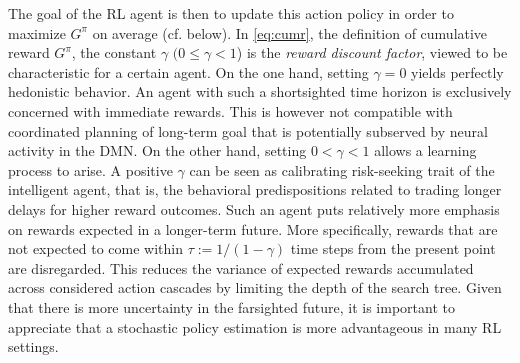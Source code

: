 \documentclass[10pt,letterpaper]{article}
\begin{document}
The goal of the RL agent is then to update this action policy in order
to maximize $G^\pi$ on average (cf. below). In \eqref{eq:cumr},
the definition of cumulative reward $G^\pi$,
the constant $\gamma$ $(0 \le \gamma < 1$) is the \textit{reward discount factor},
viewed to be characteristic for a certain agent.
On the one hand,
setting $\gamma = 0$ yields perfectly hedonistic behavior.
An agent with such a shortsighted time horizon is exclusively
concerned with immediate rewards.
This is however not compatible with coordinated planning of long-term goal that is
potentially subserved by neural activity in the DMN.
On the other hand,
setting $0 < \gamma < 1$ allows a learning process to arise.
A positive $\gamma$ can be seen as calibrating risk-seeking trait of the intelligent agent,
that is, the behavioral predispositions related to trading longer delays
for higher reward outcomes.
Such an agent puts relatively more emphasis on rewards expected in
a longer-term future.
More specifically,
rewards that are not expected to come within
$\tau := 1/(1 - \gamma)$
time steps from the present point are disregarded. This reduces the variance of expected rewards accumulated across
considered action cascades by limiting the depth of the search tree.
Given that there is more uncertainty in the farsighted future,
it is important to appreciate that a stochastic policy estimation
is more advantageous in many RL settings.
\end{document}
